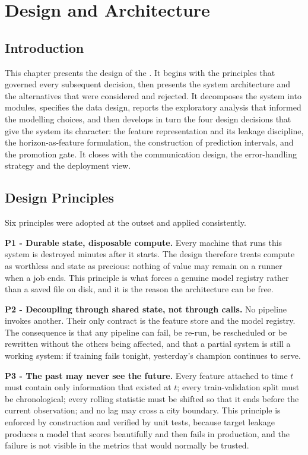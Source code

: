 \chapter{Design and Architecture}
\label{ch:design}

\section{Introduction}
This chapter presents the design of the \projname. It begins with the principles
that governed every subsequent decision, then presents the system architecture
and the alternatives that were considered and rejected. It decomposes the system
into modules, specifies the data design, reports the exploratory analysis that
informed the modelling choices, and then develops in turn the four design
decisions that give the system its character: the feature representation and its
leakage discipline, the horizon-as-feature formulation, the construction of
prediction intervals, and the promotion gate. It closes with the communication
design, the error-handling strategy and the deployment view.

\section{Design Principles}
Six principles were adopted at the outset and applied consistently.

\textbf{P1 - Durable state, disposable compute.} Every machine that runs this
system is destroyed minutes after it starts. The design therefore treats compute
as worthless and state as precious: nothing of value may remain on a runner when
a job ends. This principle is what forces a genuine model registry rather than a
saved file on disk, and it is the reason the architecture can be free.

\textbf{P2 - Decoupling through shared state, not through calls.} No pipeline
invokes another. Their only contract is the feature store and the model registry.
The consequence is that any pipeline can fail, be re-run, be rescheduled or be
rewritten without the others being affected, and that a partial system is still a
working system: if training fails tonight, yesterday's champion continues to
serve.

\textbf{P3 - The past may never see the future.} Every feature attached to time
$t$ must contain only information that existed at $t$; every train-validation
split must be chronological; every rolling statistic must be shifted so that it
ends before the current observation; and no lag may cross a city boundary. This
principle is enforced by construction and verified by unit tests, because target
leakage produces a model that scores beautifully and then fails in production,
and the failure is not visible in the metrics that would normally be trusted.

